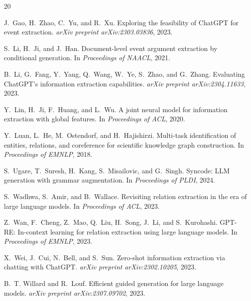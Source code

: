 \documentclass[11pt]{article}
\begin{document}

\begin{thebibliography}{20}

J.~Gao, H.~Zhao, C.~Yu, and R.~Xu.
\newblock Exploring the feasibility of ChatGPT for event extraction.
\newblock \emph{arXiv preprint arXiv:2303.03836}, 2023.

S.~Li, H.~Ji, and J.~Han.
\newblock Document-level event argument extraction by conditional generation.
\newblock In \emph{Proceedings of NAACL}, 2021.

B.~Li, G.~Fang, Y.~Yang, Q.~Wang, W.~Ye, S.~Zhao, and G.~Zhang.
\newblock Evaluating ChatGPT's information extraction capabilities.
\newblock \emph{arXiv preprint arXiv:2304.11633}, 2023.

Y.~Lin, H.~Ji, F.~Huang, and L.~Wu.
\newblock A joint neural model for information extraction with global features.
\newblock In \emph{Proceedings of ACL}, 2020.

Y.~Luan, L.~He, M.~Ostendorf, and H.~Hajishirzi.
\newblock Multi-task identification of entities, relations, and coreference for scientific knowledge graph construction.
\newblock In \emph{Proceedings of EMNLP}, 2018.

S.~Ugare, T.~Suresh, H.~Kang, S.~Misailovic, and G.~Singh.
\newblock Syncode: LLM generation with grammar augmentation.
\newblock In \emph{Proceedings of PLDI}, 2024.

S.~Wadhwa, S.~Amir, and B.~Wallace.
\newblock Revisiting relation extraction in the era of large language models.
\newblock In \emph{Proceedings of ACL}, 2023.

Z.~Wan, F.~Cheng, Z.~Mao, Q.~Liu, H.~Song, J.~Li, and S.~Kurohashi.
\newblock GPT-RE: In-context learning for relation extraction using large language models.
\newblock In \emph{Proceedings of EMNLP}, 2023.

X.~Wei, J.~Cui, N.~Bell, and S.~Sun.
\newblock Zero-shot information extraction via chatting with ChatGPT.
\newblock \emph{arXiv preprint arXiv:2302.10205}, 2023.

B.~T. Willard and R.~Louf.
\newblock Efficient guided generation for large language models.
\newblock \emph{arXiv preprint arXiv:2307.09702}, 2023.


\end{thebibliography}
\end{document}
